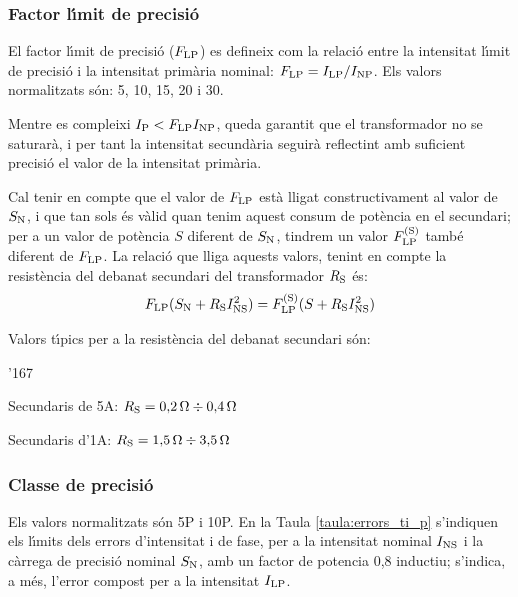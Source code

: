 \subsubsection{Factor l\'{\i}mit de precisi\'{o}}

 El factor l\'{\i}mit de precisi\'{o}
($F_\mathrm{LP}$) es defineix com la relaci\'{o} entre la intensitat l\'{\i}mit de precisi\'{o}
i la intensitat prim\`{a}ria nominal: $F_\mathrm{LP} = I_\mathrm{LP} /I_\mathrm{NP}$.
Els valors normalitzats s\'{o}n: 5, 10, 15, 20 i 30.

Mentre es compleixi  $I_\mathrm{P}<F_\mathrm{LP} I_\mathrm{NP}$, queda garantit
que el transformador no se saturar\`{a}, i per tant la intensitat
secund\`{a}ria seguir\`{a} reflectint amb suficient precisi\'{o} el valor de la
intensitat prim\`{a}ria.

Cal tenir en compte que el valor de $F_\mathrm{LP}$ est\`{a} lligat
constructivament al valor de $S_\mathrm{N}$, i que tan sols \'{e}s v\`{a}lid
quan tenim aquest consum de  pot\`{e}ncia en el secundari; per a un
valor de pot\`{e}ncia $S$ diferent de $S_\mathrm{N}$, tindrem un valor
$F_\mathrm{LP}^\mathrm{(S)}$ tamb\'{e} diferent de  $F_\mathrm{LP}$. La relaci\'{o} que
lliga aquests valors, tenint en compte la resist\`{e}ncia del debanat
secundari del transformador  $R_\mathrm{S}$ \'{e}s:
\begin{equation}\label{eq:flp}
    F_\mathrm{LP} (S_\mathrm{N}+R_\mathrm{S}I_\mathrm{NS}^2) =
    F_\mathrm{LP}^\mathrm{(S)} (S+R_\mathrm{S}I_\mathrm{NS}^2)
\end{equation}

Valors t\'{\i}pics per a la resist\`{e}ncia del debanat secundari s\'{o}n:
\begin{dinglist}{'167}
    \item Secundaris de 5\unit{A}: $R_\mathrm{S} = 0{,}2\mathrm{\,\mathrm{\Omega}}\div 0{,}4\mathrm{\,\mathrm{\Omega}}$
    \item Secundaris d'1\unit{A}:  $R_\mathrm{S} = 1{,}5\mathrm{\,\mathrm{\Omega}}\div 3{,}5\mathrm{\,\mathrm{\Omega}}$
\end{dinglist}

\subsubsection{Classe de precisi\'{o}}

 Els valors normalitzats s\'{o}n 5P i 10P.
En la Taula \vref{taula:errors_ti_p} s'indiquen els l\'{\i}mits dels
errors d'intensitat i de fase,  per a la intensitat nominal
$I_\mathrm{NS}$ i  la c\`{a}rrega de precisi\'{o} nominal $S_\mathrm{N}$,  amb un
factor de potencia 0,8 inductiu; s'indica, a m\'{e}s, l'error
compost per a la intensitat $I_\mathrm{LP}$.

